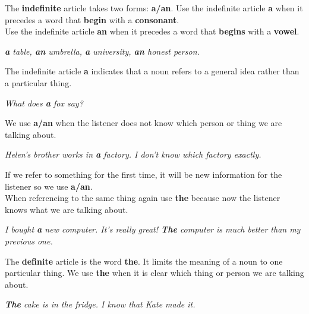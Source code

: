 \documentclass[10pt,a4paper]{article}
\begin{document}
The \textbf{indefinite} article takes two forms: \textbf{a/an}. Use the indefinite article \textbf{a} when it precedes a word that \textbf{begin} with a \textbf{consonant}.\\
Use the indefinite article \textbf{an} when it precedes a word that \textbf{begins} with a \textbf{vowel}.
\begin{center}
		\textit{ \textbf{a} table, \textbf{an} umbrella, \textbf{a} university, \textbf{an} honest person.}
\end{center}
The indefinite article \textbf{a} indicates that a noun refers to a general idea rather than a particular thing.
\begin{center}
\textit{What does \textbf{a} fox say?}
\end{center}
We use \textbf{a/an} when the listener does not know which person or thing we are talking about.
\begin{center}
		\textit{Helen's brother works in \textbf{a} factory. I don't know which factory exactly.}
\end{center}
\newpage
If we refer to something for the first time, it will be new information for the listener so we use \textbf{a/an}.\\
When referencing to the same thing again use \textbf{the} because now the listener knows what we are talking about.
\begin{center}
\textit{I bought \textbf{a} new computer. It's really great! \textbf{The} computer is much better than my previous one.}
\end{center}

The \textbf{definite} article is the word \textbf{the}. It limits the meaning of a noun to one particular thing. We use \textbf{the} when it is clear which thing or person we are talking about.
\begin{center}
\textit{ \textbf{The} cake is in the fridge. I know that Kate made it.}
\end{center}
\end{document}

